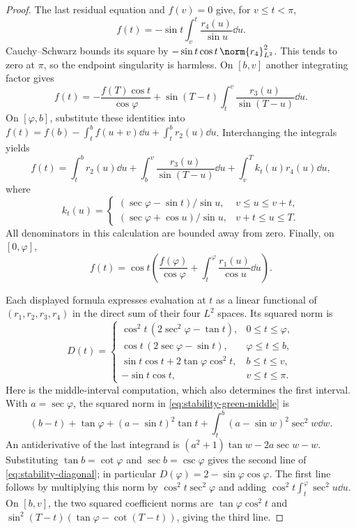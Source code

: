 \begin{proof}
The last residual equation and $f(v)=0$ give, for $v\le t<\pi$,
\[
 f(t)=-\sin t\int_v^t\frac{r_4(u)}{\sin u}\dd u.
\]
Cauchy--Schwarz bounds its square by
$-\sin t\cos t\,\norm{r_4}_{L^2}^2$. This tends to zero at $\pi$, so the
endpoint singularity is harmless. On $[b,v]$ another integrating factor gives
\[
 f(t)=-\frac{f(T)\cos t}{\cos\varphi}
       +\sin(T-t)\int_t^v\frac{r_3(u)}{\sin(T-u)}\dd u.
\]
On $[\varphi,b]$, substitute these identities into
$f(t)=f(b)-\int_t^b f(u+v)\dd u+\int_t^b r_2(u)\dd u$. Interchanging the
integrals yields
\begin{equation}\label{eq:stability-green-middle}
 f(t)=\int_t^b r_2(u)\dd u
     +\int_b^v\frac{r_3(u)}{\sin(T-u)}\dd u
     +\int_v^T k_t(u)r_4(u)\dd u,
\end{equation}
where
\[
 k_t(u)=
 \begin{cases}
  (\sec\varphi-\sin t)/\sin u,&v\le u\le v+t,\\
  (\sec\varphi+\cos u)/\sin u,&v+t\le u\le T.
 \end{cases}
\]
All denominators in this calculation are bounded away from zero. Finally,
on $[0,\varphi]$,
\[
 f(t)=\cos t\left(\frac{f(\varphi)}{\cos\varphi}
                    +\int_t^\varphi\frac{r_1(u)}{\cos u}\dd u\right).
\]

Each displayed formula expresses evaluation at $t$ as a linear functional
of $(r_1,r_2,r_3,r_4)$ in the direct sum of their four $L^2$ spaces. Its squared
norm is
\begin{equation}\label{eq:stability-diagonal}
 D(t)=
 \begin{cases}
 \cos^2t\,(2\sec^2\varphi-\tan t),&0\le t\le\varphi,\\
 \cos t\,(2\sec\varphi-\sin t),&\varphi\le t\le b,\\
 \sin t\cos t+2\tan\varphi\cos^2t,&b\le t\le v,\\
 -\sin t\cos t,&v\le t\le\pi.
 \end{cases}
\end{equation}
Here is the middle-interval computation, which also determines the first
interval. With $a=\sec\varphi$, the squared norm in
\eqref{eq:stability-green-middle} is
\[
 (b-t)+\tan\varphi+(a-\sin t)^2\tan t
       +\int_t^b(a-\sin w)^2\sec^2w\dd w.
\]
An antiderivative of the last integrand is
$(a^2+1)\tan w-2a\sec w-w$. Substituting
$\tan b=\cot\varphi$ and $\sec b=\csc\varphi$ gives the second line of
\eqref{eq:stability-diagonal}; in particular
$D(\varphi)=2-\sin\varphi\cos\varphi$. The first line follows by multiplying
this norm by $\cos^2t\sec^2\varphi$ and adding
$\cos^2t\int_t^\varphi\sec^2u\dd u$. On $[b,v]$, the two squared coefficient
norms are $\tan\varphi\cos^2t$ and
$\sin^2(T-t)(\tan\varphi-\cot(T-t))$, giving the third line.


\end{proof}
